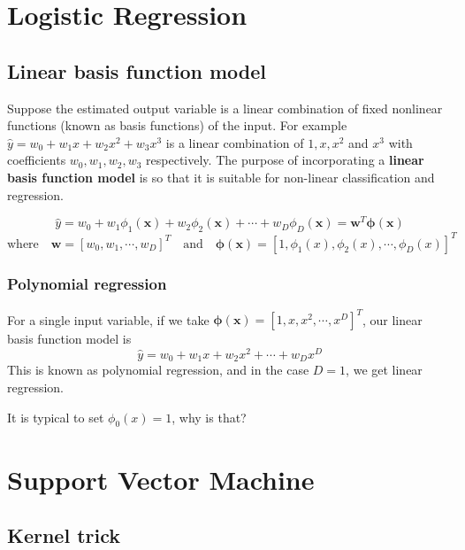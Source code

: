 \documentclass[11pt,fleqn]{book} %
\begin{document}

\chapter{Logistic Regression}

\section{Linear basis function model}
Suppose the estimated output variable is a linear combination of fixed nonlinear functions (known as basis functions) of the input. For example $\hat{y} = w_0 + w_1x + w_2x^2 + w_3x^3$ is a linear combination of $1, x, x^2$ and $x^3$ with coefficients $w_0, w_1, w_2, w_3$ respectively. The purpose of incorporating a \textbf{linear basis function model} is so that it is suitable for non-linear classification and regression.

$$\hat{y} = w_0 + w_1\phi_1(\bm{x}) + w_2\phi_2(\bm{x}) + \cdots + w_D\phi_D(\bm{x}) = \bm{w}^T\bm{\phi(x)}$$
$$\text{where} \quad \bm{w} = [w_0, w_1, \cdots, w_D]^T \quad \text{and} \quad \bm{\phi(x)} = [1, \phi_1(x), \phi_2(x), \cdots, \phi_D(x)]^T$$

\subsection{Polynomial regression}
For a single input variable, if we take $\bm{\phi(x)} = [1, x, x^2, \cdots, x^D]^T$, our linear basis function model is
$$\hat{y} = w_0 + w_1x + w_2x^2 + \cdots + w_Dx^D$$
This is known as polynomial regression, and in the case $D = 1$, we get linear regression.

\begin{exercise}
	It is typical to set $\phi_0(x) = 1$, why is that?
\end{exercise}


\chapter{Support Vector Machine}

\section{Kernel trick}
\end{document}
